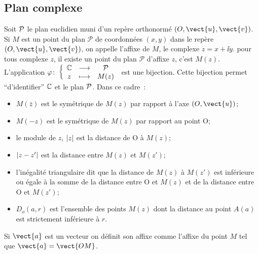 \subsection{Plan complexe}
\label{subsec:plancomplexe}
%
Soit $\P$ le plan euclidien muni d'un repère orthonormé $(O,\vect{u}, \vect{v})$. Si $M$ est un point du plan $\mathcal{P}$ de coordonnées $(x,y)$ dans le repère $(O,\vect{u}, \vect{v})$, on appelle l'affixe de $M$, le complexe $z=x + \ii y$. pour tous complexe $z$, il existe un point du plan $\mathcal{P}$ d'affixe $z$, c'est $M(z)$. L'application $\fonction{\varphi}{\C}{\P}{z}{M(z)}$ est une bijection. Cette bijection permet ``d'identifier'' $\C$ et le plan $\P$. Dans ce cadre~:
\begin{itemize}
\item $M(\bar{z})$ est le symétrique de $M(z)$ par rapport à l'axe $(O,\vect{u})$;
\item $M(-z)$ est le symétrique de $M(z)$ par rapport au point O;
\item le module de $z$, $\abs{z}$ est la distance de O à $M(z)$;
\item $\abs{z-z'}$ est la distance entre $M(z)$ et $M(z')$;
\item l'inégalité triangulaire dit que la distance de $M(z)$ à $M(z')$ est inférieure ou égale à la somme de la distance entre O et $M(z)$ et de la distance entre O et $M(z')$;
\item $D_o(a,r)$ est l'ensemble des points $M(z)$ dont la distance au point $A(a)$ est strictement inférieure à $r$.
\end{itemize}
Si $\vect{a}$ est un vecteur on définit son affixe comme l'affixe du point $M$ tel que $\vect{a}=\vect{OM}$. 




